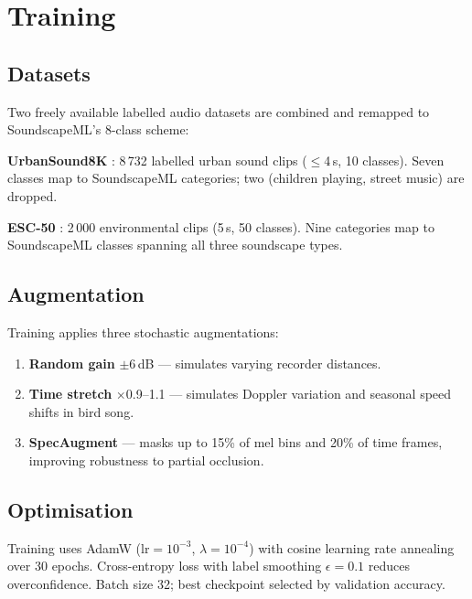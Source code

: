 \documentclass[10pt,twocolumn]{article}
\begin{document}
\section{Training}
\label{sec:training}

\subsection{Datasets}

Two freely available labelled audio datasets are combined and remapped to
SoundscapeML's 8-class scheme:

\textbf{UrbanSound8K} \cite{salamon2014}: 8\,732 labelled urban sound clips
($\leq$4\,s, 10 classes).  Seven classes map to SoundscapeML categories;
two (children playing, street music) are dropped.

\textbf{ESC-50} \cite{piczak2015}: 2\,000 environmental clips (5\,s, 50 classes).
Nine categories map to SoundscapeML classes spanning all three soundscape types.

\subsection{Augmentation}

Training applies three stochastic augmentations:
\begin{enumerate}[topsep=2pt, itemsep=1pt]
  \item \textbf{Random gain} $\pm$6\,dB — simulates varying recorder distances.
  \item \textbf{Time stretch} $\times$0.9–1.1 — simulates Doppler variation
        and seasonal speed shifts in bird song.
  \item \textbf{SpecAugment} \cite{park2019} — masks up to 15\% of mel bins
        and 20\% of time frames, improving robustness to partial occlusion.
\end{enumerate}

\subsection{Optimisation}

Training uses AdamW \cite{loshchilov2019} ($\mathrm{lr}=10^{-3}$,
$\lambda=10^{-4}$) with cosine learning rate annealing over 30 epochs.
Cross-entropy loss with label smoothing $\epsilon=0.1$ reduces overconfidence.
Batch size 32; best checkpoint selected by validation accuracy.
\end{document}

